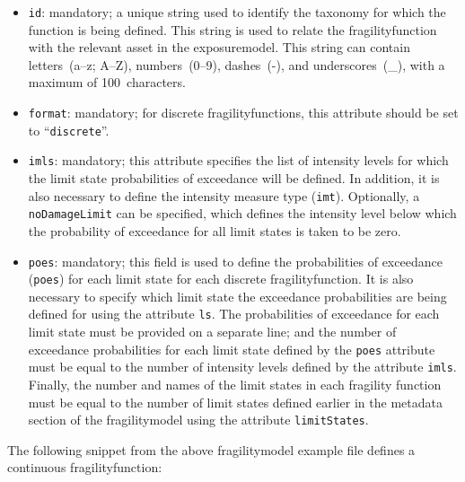 \begin{itemize}

    \item \Verb+id+: mandatory; a unique string used to identify the 
      \gls{taxonomy} for which the function is being defined. This string is
      used to relate the \gls{fragilityfunction} with the relevant \gls{asset}
      in the \gls{exposuremodel}. This string can contain letters~(a--z; A--Z),
      numbers~(0--9), dashes~(-), and underscores~(\_), with a maximum of
      100~characters.

    \item \Verb+format+: mandatory; for discrete \glspl{fragilityfunction}, this
      attribute should be set to ``\Verb+discrete+''.

    \item \Verb+imls+: mandatory; this attribute specifies the list of intensity levels
      for which the limit state probabilities of exceedance will be defined. 
      In addition, it is also necessary to define the intensity measure type 
      (\Verb+imt+). Optionally, a \Verb+noDamageLimit+ can be specified, which 
      defines the intensity level below which the probability of exceedance 
      for all limit states is taken to be zero.

    \item \Verb+poes+: mandatory; this field is used to define the probabilities of 
      exceedance (\Verb+poes+) for each limit state for each discrete 
      \gls{fragilityfunction}. It is also necessary to specify which limit 
      state the exceedance probabilities are being defined for using the 
      attribute \Verb+ls+. The probabilities of exceedance for each limit state
      must be provided on a separate line; and the number of exceedance 
      probabilities for each limit state defined by the \Verb+poes+ attribute 
      must be equal to the number of intensity levels defined by the attribute 
      \Verb+imls+. Finally, the number and names of the limit states in each 
      fragility function must be equal to the number of limit states defined 
      earlier in the metadata section of the \gls{fragilitymodel} using the 
      attribute \Verb+limitStates+.

\end{itemize}



The following snippet from the above \gls{fragilitymodel} example file
defines a continuous \gls{fragilityfunction}:

\inputminted[firstline=19,firstnumber=19,lastline=25,fontsize=\footnotesize,frame=single,linenos,bgcolor=lightgray]{xml}{oqum/risk/Verbatim/input_fragility.xml}

